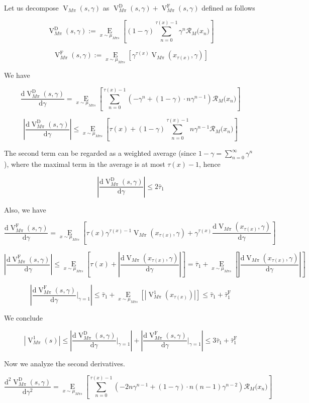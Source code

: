 \documentclass[a4paper]{article}
\newcommand{\AP}[1]{\left(#1\right)}
\newcommand{\AB}[1]{\left[#1\right]}
\newcommand{\Ea}[2]{\underset{#1}{\operatorname{E}}\AB{#2}}
\newcommand{\D}{\mathrm{d}}
\newcommand{\Abs}[1]{\left\vert #1 \right\vert}
\newcommand{\R}{\mathcal{R}}
\newcommand{\RMD}{\mathrm{D}}
\newcommand{\RMF}{\mathrm{F}}
\newcommand{\V}{\operatorname{V}}
\begin{document}
Let us decompose $\V_{M\pi}(s,\gamma)$ as $\V_{M\pi}^\RMD(s,\gamma)+\V_{M\pi}^\RMF(s,\gamma)$ defined as follows

$$\V_{M\pi}^\RMD(s,\gamma) := \Ea{x\sim\mu_{M\pi s}}{(1-\gamma)\sum_{n=0}^{\tau(x)-1} \gamma^n \R_M\Big(x_n\Big) }$$

$$\V_{M\pi}^\RMF(s,\gamma) := \Ea{x\sim\mu_{M\pi s}}{\gamma^{\tau(x)}\V_{M\pi}\AP{x_{\tau(x)},\gamma}}$$

We have

$$\frac{\D\V_{M\pi}^\RMD(s,\gamma)}{\D\gamma} = \Ea{x\sim\mu_{M\pi s}}{\sum_{n=0}^{\tau(x)-1} \AP{-\gamma^n+(1-\gamma)\cdot n\gamma^{n-1}} \R_M\Big(x_n\Big)}$$

$$\Abs{\frac{\D\V_{M\pi}^\RMD(s,\gamma)}{\D\gamma}} \leq \Ea{x\sim\mu_{M\pi s}}{\tau(x)+(1-\gamma)\sum_{n=0}^{\tau(x)-1} n\gamma^{n-1} \R_M\Big(x_n\Big) }$$

The second term can be regarded as a weighted average (since $1-\gamma=\sum_{n=0}^\infty \gamma^n$), where the maximal term in the average is at most $\tau(x)-1$, hence

$$\Abs{\frac{\D\V_{M\pi}^\RMD(s,\gamma)}{\D\gamma}} \leq 2 \bar{\tau}_1$$

Also, we have

$$\frac{\D\V_{M\pi}^\RMF(s,\gamma)}{\D\gamma} = \Ea{x\sim\mu_{M\pi s}}{\tau(x)\gamma^{\tau(x)-1}\V_{M\pi}\AP{x_{\tau(x)},\gamma}+\gamma^{\tau(x)}\frac{\D\V_{M\pi}\AP{x_{\tau(x)},\gamma}}{\D\gamma}}$$

$$\Abs{\frac{\D\V_{M\pi}^\RMF(s,\gamma)}{\D\gamma}} \leq \Ea{x\sim\mu_{M\pi s}}{ \tau(x)+\Abs{\frac{\D\V_{M\pi}\AP{x_{\tau(x)},\gamma}}{\D\gamma}}} = \bar{\tau}_1 + \Ea{x\sim\mu_{M\pi s}}{\Abs{\frac{\D\V_{M\pi}\AP{x_{\tau(x)},\gamma}}{\D\gamma}}}$$

$$\Abs{\frac{\D\V_{M\pi}^\RMF(s,\gamma)}{\D\gamma}\bigg\vert_{\gamma=1}} \leq \bar{\tau}_1 + \Ea{x\sim\mu_{M\pi s}}{\Abs{\V_{M\pi}^1\AP{x_{\tau(x)}}}} \leq \bar{\tau}_1 + \bar{\tau}_1^\RMF$$

We conclude

$$\Abs{\V_{M\pi}^1(s)} \leq \Abs{\frac{\D\V_{M\pi}^\RMD(s,\gamma)}{\D\gamma}\bigg\vert_{\gamma=1}}+\Abs{\frac{\D\V_{M\pi}^\RMF(s,\gamma)}{\D\gamma}\bigg\vert_{\gamma=1}} \leq 3 \bar{\tau}_1 + \bar{\tau}_1^\RMF$$

Now we analyze the second derivatives.

$$\frac{\D^2\V_{M\pi}^\RMD(s,\gamma)}{\D\gamma^2} = \Ea{x\sim\mu_{M\pi s}}{\sum_{n=0}^{\tau(x)-1} \AP{-2n\gamma^{n-1}+(1-\gamma)\cdot n(n-1)\gamma^{n-2}} \R_M\Big(x_n\Big)}$$
\end{document}
